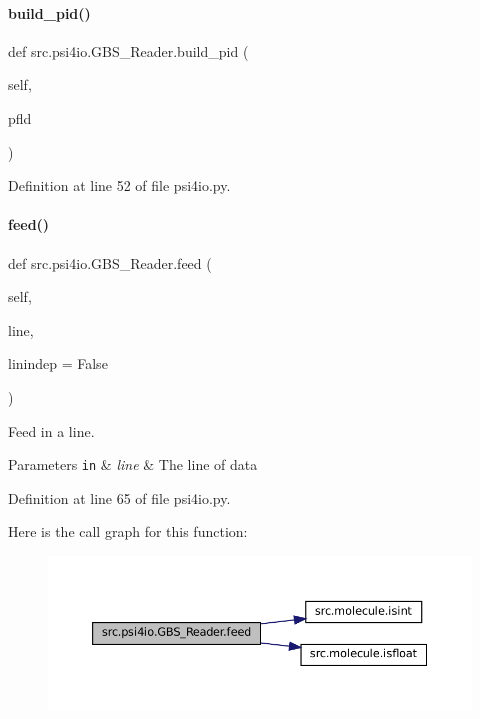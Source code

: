 \paragraph{\texorpdfstring{build\+\_\+pid()}{build\_pid()}}
{\footnotesize\ttfamily def src.\+psi4io.\+G\+B\+S\+\_\+\+Reader.\+build\+\_\+pid (\begin{DoxyParamCaption}\item[{}]{self,  }\item[{}]{pfld }\end{DoxyParamCaption})}



Definition at line 52 of file psi4io.\+py.

\mbox{\label{classsrc_1_1psi4io_1_1GBS__Reader_a66aa5de319783c2cd7337d436e6a64de}} 
\paragraph{\texorpdfstring{feed()}{feed()}}
{\footnotesize\ttfamily def src.\+psi4io.\+G\+B\+S\+\_\+\+Reader.\+feed (\begin{DoxyParamCaption}\item[{}]{self,  }\item[{}]{line,  }\item[{}]{linindep = {\ttfamily False} }\end{DoxyParamCaption})}



Feed in a line. 


\begin{DoxyParams}[1]{Parameters}
\mbox{\tt in}  & {\em line} & The line of data \\
\hline
\end{DoxyParams}


Definition at line 65 of file psi4io.\+py.

Here is the call graph for this function\+:
\nopagebreak
\begin{figure}[H]
\begin{center}
\leavevmode
\includegraphics[width=350pt]{classsrc_1_1psi4io_1_1GBS__Reader_a66aa5de319783c2cd7337d436e6a64de_cgraph}
\end{center}
\end{figure}


